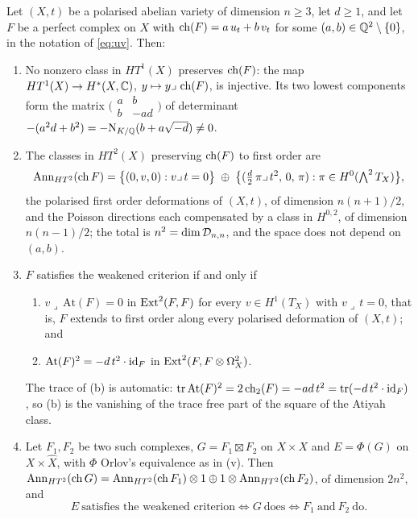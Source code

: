 \begin{theorem}\label{thm:factor}
Let $(X,t)$ be a polarised abelian variety of dimension $n\ge3$, let $d\ge1$,
and let $F$ be a perfect complex on $X$ with
$\operatorname{ch}(F)=a\,u_{t}+b\,v_{t}$ for some $(a,b)\in\mathbb{Q}^{2}\setminus\{0\}$, in the
notation of \eqref{eq:uv}. Then:
\begin{enumerate}[label=\textup{(\roman*)},nosep]
\item No nonzero class in $HT^{1}(X)$ preserves $\operatorname{ch}(F)$: the map
  $HT^{1}(X)\to H^{*}(X,\mathbb{C})$, $y\mapsto y\lrcorner\,\operatorname{ch}(F)$, is injective. Its
  two lowest components form the matrix
  $\bigl(\begin{smallmatrix}a&b\\ b&-ad\end{smallmatrix}\bigr)$ of
  determinant $-(a^{2}d+b^{2})=-\mathrm{N}_{K/\mathbb{Q}}(b+a\sqrt{-d})\ne0$.
\item The classes in $HT^{2}(X)$ preserving $\operatorname{ch}(F)$ to first order are
  \begin{equation}\label{eq:secantkernel}
    \operatorname{Ann}_{HT^{2}}(\operatorname{ch} F)
    =\bigl\{(0,v,0):v\lrcorner\,t=0\bigr\}\;\oplus\;
     \bigl\{(\tfrac d2\,\pi\lrcorner\,t^{2},\,0,\,\pi):
       \pi\in H^{0}(\textstyle\bigwedge^{2}T_{X})\bigr\},
  \end{equation}
  the polarised first order deformations of $(X,t)$, of dimension $n(n+1)/2$,
  and the Poisson directions each compensated by a class in $H^{0,2}$, of
  dimension $n(n-1)/2$; the total is $n^{2}=\dim\mathcal{D}_{n,n}$, and the space
  does not depend on $(a,b)$.
\item $F$ satisfies the weakened criterion if and only if
  \begin{enumerate}[label=\textup{(\alph*)},nosep]
  \item $v\lrcorner\,\mathrm{At}(F)=0$ in $\operatorname{Ext}^{2}(F,F)$ for every
    $v\in H^{1}(T_{X})$ with $v\lrcorner\,t=0$, that is, $F$ extends to first
    order along every polarised deformation of $(X,t)$; and
  \item $\mathrm{At}(F)^{2}=-d\,t^{2}\cdot\operatorname{id}_{F}$ in
    $\operatorname{Ext}^{2}(F,F\otimes\Omega^{2}_{X})$.
  \end{enumerate}
  The trace of (b) is automatic: $\operatorname{tr}\mathrm{At}(F)^{2}
  =2\operatorname{ch}_{2}(F)=-ad\,t^{2}=\operatorname{tr}(-d\,t^{2}\cdot\operatorname{id}_{F})$, so (b)
  is the vanishing of the trace free part of the square of the Atiyah class.
\item Let $F_{1},F_{2}$ be two such complexes, $G=F_{1}\boxtimes F_{2}$ on
  $X\times X$ and $E=\Phi(G)$ on $X\times\widehat X$, with $\Phi$ Orlov's
  equivalence as in (v). Then
  $\operatorname{Ann}_{HT^{2}}(\operatorname{ch} G)=\operatorname{Ann}_{HT^{2}}(\operatorname{ch} F_{1})\otimes1\oplus
  1\otimes\operatorname{Ann}_{HT^{2}}(\operatorname{ch} F_{2})$, of dimension $2n^{2}$, and
  \[
    E\ \text{satisfies the weakened criterion}
    \iff G\ \text{does}
    \iff F_{1}\ \text{and}\ F_{2}\ \text{do}.
  \]
\end{enumerate}
\end{theorem}

